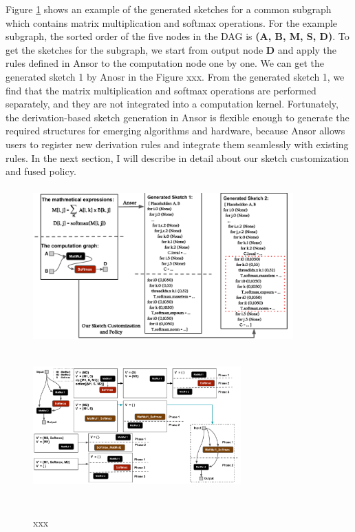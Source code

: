 Figure \ref{fig:fig4} shows an example of the generated sketches for a common subgraph which contains matrix multiplication and softmax operations. For the example subgraph, 
the sorted order of the five nodes in the DAG is \textbf{(A, B, M, S, D)}. To get the sketches for the subgraph, we start from output node \textbf{D} and apply the rules
defined in Ansor to the computation node one by one. We can get the generated sketch 1 by Anosr in the Figure xxx. From the generated sketch 1, we find that the matrix 
multiplication and softmax operations are performed separately, and they are not integrated into a computation kernel. Fortunately, the derivation-based sketch generation 
in Ansor is flexible enough to generate the required structures for emerging algorithms and hardware, because Ansor allows users to register new derivation rules and integrate
them seamlessly with existing rules. In the next section, I will describe in detail about our sketch customization and fused policy.
\begin{figure}[htbp]
    \centering
    \includegraphics[height=6cm, width=10cm]{figs/fig4}
    \includegraphics[height=6cm, width=8cm]{figs/fig7}
    \caption{xxx}
    \label{fig:fig4}
\end{figure}

